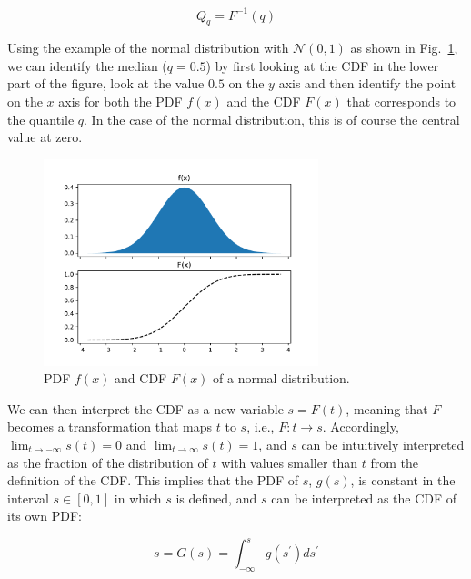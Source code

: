 \documentclass[BCOR=1mm, DIV=calc,10pt,
twoside=true,
twocolumn,
headings=normal]{scrartcl}
\newcommand{\fig}{Fig.~}
\begin{document}
\begin{equation}
Q_q = F^{-1}(q)
\end{equation}

Using the example of the normal distribution with $\mathcal{N}(0,1)$ as shown in \fig \ref{fig:PdfCdf}, we can identify the median ($q = 0.5$) by first looking at the CDF in the lower part of the figure, look at the value $0.5$ on the $y$ axis and then identify the point on the $x$ axis for both the PDF $f(x)$ and the CDF $F(x)$ that corresponds to the quantile $q$. In the case of the normal distribution, this is of course the central value at zero.

\begin{figure}
\begin{center}
\includegraphics[width=8cm]{PdfCdf}
\caption{\label{fig:PdfCdf} PDF $f(x)$ and CDF $F(x)$ of a normal distribution.}
\end{center}
\end{figure}

We can then interpret the CDF as a new variable $s = F(t)$, meaning that $F$ becomes a transformation that maps $t$ to $s$, i.e., $F:t \to s$. Accordingly,  $\lim_{t \to -\infty}s(t) = 0$ and $\lim_{t \to \infty}s(t) = 1$, and $s$ can be intuitively interpreted as the fraction of the distribution of $t$ with values smaller than $t$ from the definition of the CDF. This implies that the PDF of $s$, $g(s)$, is constant in the interval $s \in [0,1]$ in which $s$ is defined, and $s$ can be interpreted as the CDF of its own PDF:

\begin{equation}
s = G(s) = \int_{-\infty}^{s} g(s^\prime) ds^\prime
\end{equation}
\end{document}
